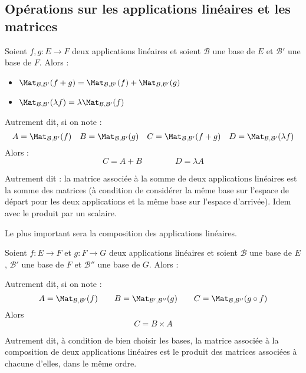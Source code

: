 \documentclass[class=report,crop=false]{standalone}
\begin{document}
\subsection{Opérations sur les applications linéaires et les matrices}

\begin{proposition}
Soient $f,g : E \to F$ deux applications linéaires et soient
$\mathcal{B}$ une base de $E$ et $\mathcal{B}'$ une base de $F$.
Alors :
\begin{itemize}
  \item $\Mat_{\mathcal{B},\mathcal{B}'} (f+g) = \Mat_{\mathcal{B},\mathcal{B}'} (f)
  + \Mat_{\mathcal{B},\mathcal{B}'} (g)$

  \item $\Mat_{\mathcal{B},\mathcal{B}'} ( \lambda f) = \lambda \Mat_{\mathcal{B},\mathcal{B}'} (f)$
\end{itemize}
\end{proposition}

Autrement dit, si on note :
$$A = \Mat_{\mathcal{B},\mathcal{B}'} (f)
\quad
B = \Mat_{\mathcal{B},\mathcal{B}'} (g)
\quad
C = \Mat_{\mathcal{B},\mathcal{B}'} (f+g)
\quad
D = \Mat_{\mathcal{B},\mathcal{B}'} (\lambda f)$$
Alors :
$$C = A+B \qquad \qquad D = \lambda A$$


Autrement dit : la matrice associée à la somme de deux applications linéaires est la
somme des matrices (à condition de considérer la même base sur l'espace de départ
pour les deux applications et la même base sur l'espace d'arrivée).
Idem avec le produit par un scalaire.

\bigskip

Le plus important sera la composition des applications linéaires.

\begin{proposition}
\label{prop:multmatlin}
Soient $f : E \to F$  et $g : F \to G$ deux applications linéaires et soient
$\mathcal{B}$ une base de $E$, $\mathcal{B}'$ une base de $F$
et $\mathcal{B}''$ une base de $G$.
Alors :
\end{proposition}
Autrement dit, si on note :
$$A = \Mat_{\mathcal{B},\mathcal{B}'} (f)
\qquad
B = \Mat_{\mathcal{B}',\mathcal{B}''} (g)
\qquad
C = \Mat_{\mathcal{B},\mathcal{B}''} (g \circ f)$$
Alors
$$C = B\times A$$

Autrement dit, à condition de bien choisir les bases, la matrice
associée à la composition de deux applications linéaires est le
produit des matrices associées à chacune d'elles, dans le même ordre.
\end{document}
